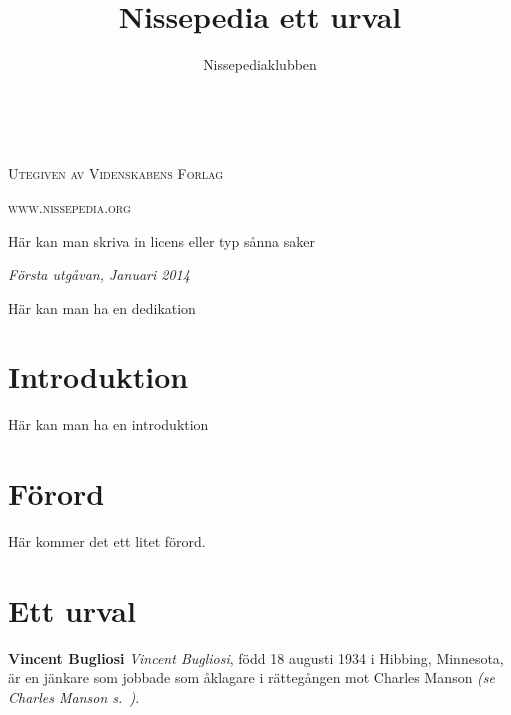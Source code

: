 \documentclass[a5paper, twoside]{book}
\title{Nissepedia ett urval}
\author{Nissepediaklubben}
\newcommand{\blankpage}{\newpage\hbox{}\thispagestyle{empty}\newpage}
\begin{document}
\small
{}

\frontmatter

\blankpage



\newpage

~\vfill
\thispagestyle{empty}
\setlength{\parindent}{0pt}
\setlength{\parskip}{\baselineskip}

\par\textsc{Utegiven av Videnskabens Forlag}

\par\textsc{www.nissepedia.org}

\par Här kan man skriva in licens eller typ sånna saker

\par\textit{Första utgåvan, Januari 2014}


\cleardoublepage

Här kan man ha en dedikation

\cleardoublepage
\chapter*{Introduktion}

Här kan man ha en introduktion


\chapter*{Förord}
Här kommer det ett litet förord.


\mainmatter

\noindent
\pagestyle{myheadings}

\chapter*{Ett urval}
\newpage



\small{
\textbf{Vincent Bugliosi}
\textit{Vincent Bugliosi}, född 18 augusti 1934 i Hibbing, Minnesota, är en jänkare som jobbade som åklagare i rättegången mot Charles Manson \textsl{(se Charles Manson s.~\pageref{charles_manson})}. 
}
\end{document}
